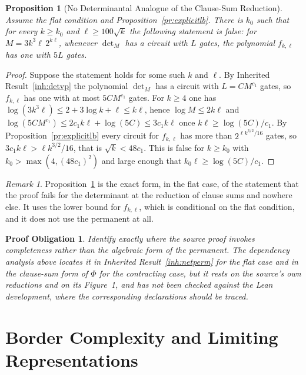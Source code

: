 \documentclass[11pt,letterpaper]{report}
\theoremstyle{plain}
\newtheorem{proposition}[theorem]{Proposition}
\newtheorem{obligation}[theorem]{Proof Obligation}
\theoremstyle{definition}
\theoremstyle{remark}
\newtheorem{remark}[theorem]{Remark}
\begin{document}
\begin{proposition}[No Determinantal Analogue of the Clause-Sum Reduction]\label{pr:nodetanalogue}
Assume the flat condition and Proposition~\ref{pr:explicitlb}. There is $k_0$ such that for every $k\ge k_0$ and $\ell\ge100\sqrt k$ the following statement is false: for $M=3k^3\ell\,2^{k\ell}$, whenever $\det_M$ has a circuit with $L$ gates, the polynomial $f_{k,\ell}$ has one with $5L$ gates.
\end{proposition}
\begin{proof}
Suppose the statement holds for some such $k$ and $\ell$. By Inherited Result~\ref{inh:detvp} the polynomial $\det_M$ has a circuit with $L=CM^{c_1}$ gates, so $f_{k,\ell}$ has one with at most $5CM^{c_1}$ gates. For $k\ge4$ one has $\log(3k^3\ell)\le2+3\log k+\ell\le k\ell$, hence $\log M\le2k\ell$ and $\log(5CM^{c_1})\le2c_1k\ell+\log(5C)\le3c_1k\ell$ once $k\ell\ge\log(5C)/c_1$. By Proposition~\ref{pr:explicitlb} every circuit for $f_{k,\ell}$ has more than $2^{\ell k^{3/2}/16}$ gates, so $3c_1k\ell>\ell k^{3/2}/16$, that is $\sqrt k<48c_1$. This is false for $k\ge k_0$ with $k_0>\max(4,(48c_1)^2)$ and large enough that $k_0\ell\ge\log(5C)/c_1$.
\end{proof}

\begin{remark}
Proposition~\ref{pr:nodetanalogue} is the exact form, in the flat case, of the statement that the proof fails for the determinant at the reduction of clause sums and nowhere else. It uses the lower bound for $f_{k,\ell}$, which is conditional on the flat condition, and it does not use the permanent at all.
\end{remark}

\begin{obligation}\label{ob:completeness}
Identify exactly where the source proof invokes completeness rather than the algebraic form of the permanent. The dependency analysis above locates it in Inherited Result~\ref{inh:netperm} for the flat case and in the clause-sum form of $\Phi$ for the contracting case, but it rests on the source's own reductions and on its Figure~1, and has not been checked against the Lean development, where the corresponding declarations should be traced.
\end{obligation}

\chapter{Border Complexity and Limiting Representations}
\end{document}
